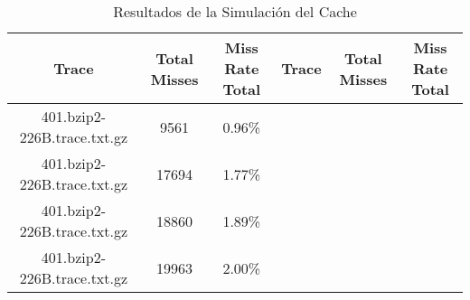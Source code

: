 \begin{table}[H]
\centering
\begin{tabular}{|c|c|c|c|c|c|}
\hline
Trace & Total Misses & Miss Rate Total & Trace & Total Misses & Miss Rate Total \\
\hline
401.bzip2-226B.trace.txt.gz & 9561 & 0.96\% & & & &  \\\hline
401.bzip2-226B.trace.txt.gz & 17694 & 1.77\% & & & &  \\\hline
401.bzip2-226B.trace.txt.gz & 18860 & 1.89\% & & & &  \\\hline
401.bzip2-226B.trace.txt.gz & 19963 & 2.00\% & & & &  \\\hline
\hline
\end{tabular}
\caption{Resultados de la Simulación del Cache}
\label{tab:cache_results}
\end{table}